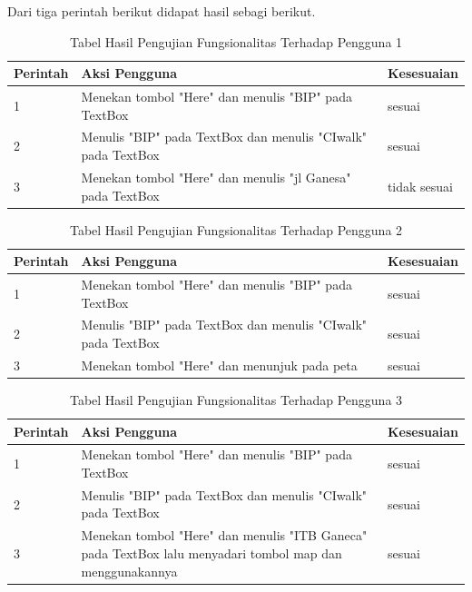Dari tiga perintah berikut didapat hasil sebagi berikut.
\begin{table}[h!]
	\centering
		\begin{tabular}{|p{}|p{9cm}|p{2cm}|}\hline
				Perintah & Aksi Pengguna & Kesesuaian \\ \hline
				1 & Menekan tombol "Here" dan menulis "BIP" pada TextBox & sesuai \\ \hline
				2 & Menulis "BIP" pada TextBox dan menulis "CIwalk" pada TextBox & sesuai \\ \hline
				3 & Menekan tombol "Here" dan menulis "jl Ganesa" pada TextBox & tidak sesuai \\ \hline
		\end{tabular}
	\caption{Tabel Hasil Pengujian Fungsionalitas Terhadap Pengguna 1}
	\label{tab:TabelHasilPengujianFungsionalitasTerhadapPengguna}
\end{table}

\begin{table}[h!]
	\centering
		\begin{tabular}{|p{}|p{9cm}|p{2cm}|}\hline
				Perintah & Aksi Pengguna & Kesesuaian \\ \hline
				1 & Menekan tombol "Here" dan menulis "BIP" pada TextBox & sesuai \\ \hline
				2 & Menulis "BIP" pada TextBox dan menulis "CIwalk" pada TextBox & sesuai \\ \hline
				3 & Menekan tombol "Here" dan menunjuk pada peta & sesuai \\ \hline
		\end{tabular}
	\caption{Tabel Hasil Pengujian Fungsionalitas Terhadap Pengguna 2}
	\label{tab:TabelHasilPengujianFungsionalitasTerhadapPengguna}
\end{table}

\newpage

\begin{table}[h!]
	\centering
		\begin{tabular}{|p{}|p{9cm}|p{2cm}|}\hline
				Perintah & Aksi Pengguna & Kesesuaian \\ \hline
				1 & Menekan tombol "Here" dan menulis "BIP" pada TextBox & sesuai \\ \hline
				2 & Menulis "BIP" pada TextBox dan menulis "CIwalk" pada TextBox & sesuai \\ \hline
				3 & Menekan tombol "Here" dan menulis "ITB Ganeca" pada TextBox lalu menyadari tombol map dan menggunakannya & sesuai \\ \hline
		\end{tabular}
	\caption{Tabel Hasil Pengujian Fungsionalitas Terhadap Pengguna 3}
	\label{tab:TabelHasilPengujianFungsionalitasTerhadapPengguna}
\end{table}

